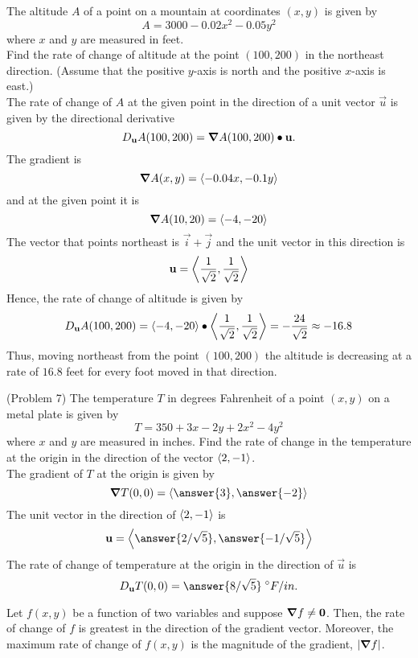\documentclass[handout]{ximera}
\begin{document}
\begin{example}[Example 7]
The altitude $A$ of a point on a mountain at coordinates $(x, y)$ is given by
\[
A = 3000 - 0.02x^2 - 0.05y^2
\]
where $x$ and $y$ are measured in feet.\\
Find the rate of change of altitude at the point $(100, 200)$ in the northeast direction. 
(Assume that the positive $y$-axis is north and the positive $x$-axis is east.)\\
The rate of change of $A$ at the given point in the direction of a unit vector $\vec u$ is given by the directional derivative
\[
D_{\mathbf u} A(100, 200) = \boldsymbol\nabla A(100,200) \bullet \mathbf u.
\]
The gradient is
\[
\boldsymbol\nabla A(x,y) = \left\langle -0.04x, -0.1y\right\rangle
\]
and at the given point it is
\[
\boldsymbol\nabla A(10,20) = \left\langle -4, -20\right\rangle
\]
The vector that points northeast is $\vec i  + \vec j$ and the unit vector in this direction is
\[
\mathbf u = \left\langle \frac{1}{\sqrt 2}, \frac{1}{\sqrt 2}\right\rangle
\]
Hence, the rate of change of altitude is given by
\[
D_{\mathbf u} A(100, 200) = \left\langle -4, -20\right\rangle \bullet \left\langle \frac{1}{\sqrt 2}, \frac{1}{\sqrt 2}\right\rangle = -\frac{24}{\sqrt 2} \approx -16.8
\]
Thus, moving northeast from the point $(100, 200)$ the altitude is decreasing at a rate of 
$16.8$ feet for every foot moved in that direction.
\end{example}

\begin{problem}(Problem 7)
The temperature $T$ in degrees Fahrenheit of a point $(x,y)$ on a metal plate is given by 
\[
T = 350 + 3x - 2y + 2x^2 - 4y^2
\]
where $x$ and $y$ are measured in inches.  Find the rate of change in the temperature at the origin in the direction of the vector $\left\langle 2,-1\right\rangle$.\\
The gradient of $T$ at the origin is given by
\[
\grad T(0,0) = \vector{\answer{3}, \answer{-2}}
\]
The unit vector in the direction of $\left\langle 2, -1\right\rangle$ is
\[
\vec u = \vector{\answer{2/\sqrt 5}, \answer{-1/\sqrt 5}}
\]
The rate of change of temperature at the origin in the direction of $\vec u$ is
\[
D_{\vec u} T(0,0) = \answer{8/ \sqrt 5} \; ^\circ F / in.
\]
\end{problem}



\begin{proposition}
Let $f(x,y)$ be a function of two variables and suppose $\boldsymbol\nabla f \neq \mathbf 0$. 
Then, the rate of change of $f$ is greatest in the direction of the gradient vector.
Moreover, the maximum rate of change of $f(x,y)$ is the magnitude of the gradient, $|\boldsymbol\nabla f|$.

\end{proposition}
\end{document}
